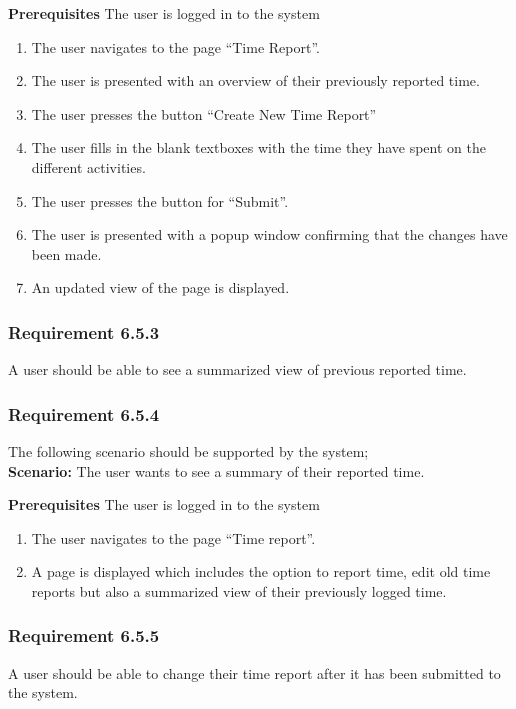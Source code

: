 \documentclass{article}
\begin{document}
\textbf{Prerequisites} The user is logged in to the system

\begin{enumerate}


\item The user navigates to the page “Time Report”. 
\item The user is presented with an overview of their previously reported time. 
\item The user presses the button “Create New Time Report”
\item The user fills in the blank textboxes with the time they have spent on the different activities.
\item The user presses the button for “Submit”.
\item The user is presented with a popup window confirming that the changes have been made.
\item An updated view of the page is displayed.
\end{enumerate}

\subsubsection{Requirement 6.5.3}
A user should be able to see a summarized view of previous reported time.

\subsubsection{Requirement 6.5.4}
The following scenario should be supported by the system;\\

\textbf{Scenario:} The user wants to see a summary of their reported time.

\textbf{Prerequisites} The user is logged in to the system
\begin{enumerate}


\item The user navigates to the page “Time report”.
\item A page is displayed which includes the option to report time, edit old time reports but also a summarized view of their previously logged time. 
\end{enumerate}

\subsubsection{Requirement 6.5.5}
A user should be able to change their time report after it has been submitted to the system.
\end{document}
